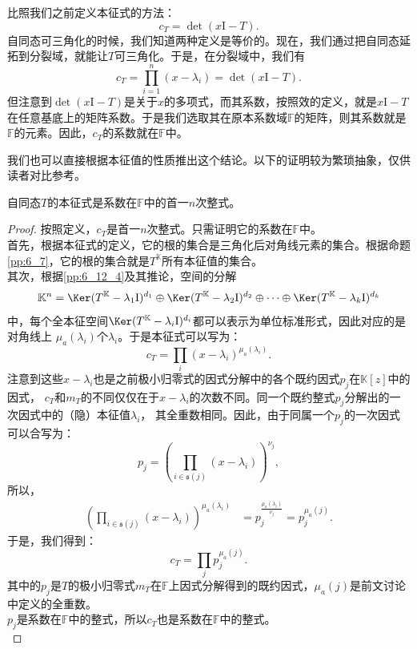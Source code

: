 \documentclass[12pt,UTF8,fontset=none]{ctexbook}
\begin{document}
比照我们之前定义本征式的方法：
$$
c_T = \det(x\mathrm{I} - T).
$$
自同态可三角化的时候，我们知道两种定义是等价的。现在，我们通过把自同态延拓到分裂域，就能让$T$可三角化。于是，在分裂域中，我们有
$$
c_T = \prod_{i=1}^n (x - \lambda_i) = \det(x\mathrm{I} - T).
$$
但注意到$\det(x\mathrm{I} - T)$是关于$x$的多项式，而其系数，按照效的定义，就是$x\mathrm{I} - T$在任意基底上的矩阵系数。于是我们选取其在原本系数域$\mathbb{F}$的矩阵，则其系数就是$\mathbb{F}$的元素。因此，$c_T$的系数就在$\mathbb{F}$中。

我们也可以直接根据本征值的性质推出这个结论。以下的证明较为繁琐抽象，仅供读者对比参考。
\begin{pp}\label{pp:9_8}
    自同态$T$的本征式是系数在$\mathbb{F}$中的首一$n$次整式。
\end{pp}
\begin{proof} %
    按照定义，$c_T$是首一$n$次整式。只需证明它的系数在$\mathbb{F}$中。\\
    首先，根据本征式的定义，它的根的集合是三角化后对角线元素的集合。根据命题\ref{pp:6_7}，它的根的集合就是$T^{\mathbb{K}}$所有本征值的集合。\\
    其次，根据\ref{pp:6_12_4}及其推论，空间的分解
    $$ \mathbb{K}^n = \Ker (T^{\mathbb{K}} - \lambda_1\mathrm{I})^{d_1} \oplus \Ker (T^{\mathbb{K}} - \lambda_2\mathrm{I})^{d_2} \oplus \cdots \oplus \Ker (T^{\mathbb{K}} - \lambda_k\mathrm{I})^{d_k}$$
    中，每个全本征空间$\Ker (T^{\mathbb{K}} - \lambda_i\mathrm{I})^{d_i}$都可以表示为单位标准形式，因此对应的是对角线上
    $\mu_a(\lambda_i)$个$\lambda_i$。于是本征式可以写为：
    $$c_T = \prod_{i} (x - \lambda_i)^{\mu_a(\lambda_i)}.$$
    注意到这些$x - \lambda_i$也是之前极小归零式的因式分解中的各个既约因式$p_j$在$\mathbb{K}[z]$中的因式，
    $c_T$和$m_T$的不同仅仅在于$x - \lambda_i$的次数不同。同一个既约整式$p_j$分解出的一次因式中的（隐）本征值$\lambda_i$，
    其全重数相同。因此，由于同属一个$p_j$的一次因式可以合写为：
    $$ p_j = \left(\prod_{i\in \mathfrak{s}(j)} (x - \lambda_i)\right)^{\nu_j}, $$
    所以，
    \begin{align*}
        \left(\prod_{i\in \mathfrak{s}(j)} (x - \lambda_i)\right)^{\mu_a(\lambda_i)} &= p_j^{\frac{\mu_a(\lambda_i)}{\nu_j}} = p_j^{\mu_a(j)}. 
    \end{align*}
    于是，我们得到：    
    $$c_T = \prod_{j} p_j^{\mu_a(j)}.$$
    其中的$p_j$是$T$的极小归零式$m_T$在$\mathbb{F}$上因式分解得到的既约因式，$\mu_a(j)$是前文讨论中定义的全重数。\\
    $p_j$是系数在$\mathbb{F}$中的整式，所以$c_T$也是系数在$\mathbb{F}$中的整式。\\
\end{proof}
\end{document}

